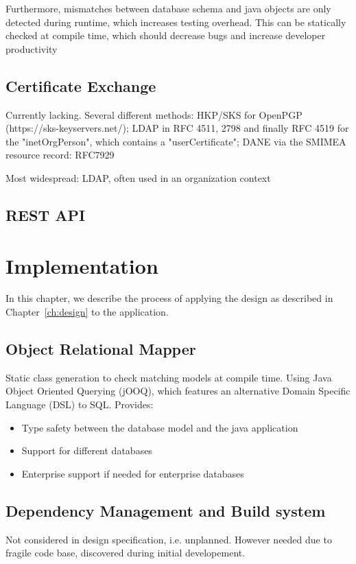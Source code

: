 Furthermore, mismatches between database schema and java objects are only detected during runtime, which increases
testing overhead.
This can be statically checked at compile time, which should decrease bugs and increase developer productivity

\section{Certificate Exchange}\label{sec:certificateExchange}
Currently lacking. Several different methods:
HKP/SKS for OpenPGP (https://sks-keyservers.net/);
LDAP in RFC 4511, 2798 and finally RFC 4519 for the "inetOrgPerson", which contains a "userCertificate";
DANE via the SMIMEA resource record: RFC7929

Most widespread: LDAP, often used in an organization context

\section{REST API}\label{sec:restApi}

\chapter{Implementation}\label{ch:implementation}

In this chapter, we describe the process of applying the design as described in Chapter~\ref{ch:design} to the
application.

\section{Object Relational Mapper}\label{sec:objectRelationalMapper}
Static class generation to check matching models at compile time.
Using Java Object Oriented Querying (jOOQ), which features an alternative Domain Specific Language (DSL) to SQL.
Provides:
\begin{itemize}
    \item Type safety between the database model and the java application
    \item Support for different databases
    \item Enterprise support if needed for enterprise databases
\end{itemize}

\section{Dependency Management and Build system}\label{sec:dependencyManagementBuildSystem}
Not considered in design specification, i.e. unplanned.
However needed due to fragile code base, discovered during initial developement.

